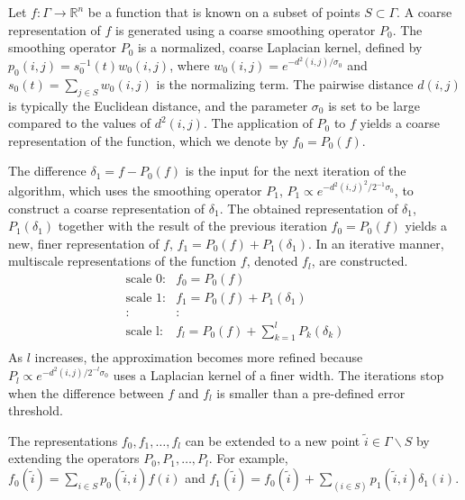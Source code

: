 \documentclass[aip,jcp,preprint]{revtex4-1}
\begin{document}
Let $f: \Gamma \rightarrow \mathbb{R}^n$ be a function that is known on a subset of points $S \subset \Gamma$.
%
A coarse representation of $f$ is generated using a coarse smoothing operator $P_0$.
%
The smoothing operator $P_0$ is a normalized, coarse Laplacian kernel, defined by $p_0(i, j)= s_0^{-1}(t)w_0(i, j)$,
where $w_0(i, j)=e^{-d^2(i, j) / \sigma_0}$ and $s_0(t)=\sum_{j \in S}w_0(i, j)$ is the normalizing term.
%
The pairwise distance $d(i, j)$ is typically the Euclidean distance, and the parameter $\sigma_0$ is set to be large compared to the values of $d^2(i, j)$.
%
The application of $P_0$ to $f$ yields a coarse representation of the function, which we denote by $f_0=P_0(f)$.

The difference $\delta_1 = f-P_0(f)$ is the input for the next iteration of the algorithm,
which uses the smoothing operator $P_1$, $P_1 \propto e^{-d^2(i, j)^2 / 2^{-1} \sigma_0}$, to construct a coarse representation of $\delta_1$.
%
The obtained representation of $\delta_1$, $P_1(\delta_1)$ together with the result of the previous iteration $f_0 = P_0(f)$
yields a new, finer representation of $f$, $f_1 = P_0(f) + P_1(\delta_1)$.
%
In an iterative manner, multiscale representations of the function $f$, denoted $f_l$, are constructed.
\begin{equation} \label{eq:LP_multi_scale}
 \begin{array}{cl}
\mbox{scale 0:} & f_0 = P_0(f) \\
\mbox{scale 1:} & f_1 = P_0(f) + P_1(\delta_1) \\
: & : \\
\mbox{scale l:} & f_l = P_0(f) + \sum_{k=1}^{l}P_k(\delta_k)\\
\end{array}
\end{equation}
As $l$ increases, the approximation becomes more refined because $P_l \propto e^{-d^2(i, j) / 2^{-l} \sigma_0}$ uses a Laplacian kernel of a finer width.
%
The iterations stop when the difference between $f$ and $f_l$ is smaller than a pre-defined error threshold.

The representations $f_0, f_1, \dots, f_l$ can be extended to a new point $\tilde{i} \in \Gamma \backslash S $ by extending the operators $P_0, P_1,\ldots,P_l$.
%
For example, $f_0(\tilde{i}) = \sum_{i \in S} p_0(\tilde{i}, i)f(i)$ and
$f_1(\tilde{i}) = f_0(\tilde{i}) + \sum_{(i \in S)}p_1(\tilde{i}, i)\delta_1(i)$.
\end{document}

